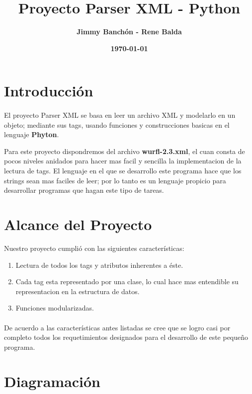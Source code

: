 \documentclass[11pt]{article}
\title{\textbf{Proyecto Parser XML - Python}}
\author{\textbf{Jimmy Banchón - Rene Balda}}
\date{\textbf{\today}}
\begin{document}


\maketitle
\section{\textbf{Introducción}} 
\paragraph{} \noindent
El proyecto Parser XML se basa en leer un archivo XML y modelarlo en un objeto; mediante sus tags, usando funciones y construcciones basicas en el lenguaje {\textbf{Phyton}}.

Para este proyecto dispondremos del archivo {\textbf{wurfl-2.3.xml}}, el cuan consta de pocos niveles anidados para hacer mas facil y sencilla la implementacion de la lectura de tags. El lenguaje en el que se desarrollo este programa hace que los strings sean mas faciles de leer; por lo tanto es un lenguaje propicio para desarrollar programas que hagan este tipo de tareas.
\section{\textbf{Alcance del Proyecto}}

Nuestro proyecto cumplió con las siguientes características:
\begin{enumerate}
\item 
Lectura de todos los tags y atributos inherentes a éste.

\item
Cada tag esta representado por una clase, lo cual hace mas entendible su representacion en la estructura de datos.

\item
Funciones modularizadas.

\end{enumerate}
\paragraph{} \noindent De acuerdo a las características antes listadas se cree que se logro casi por completo todos los requetimientos designados para el desarrollo de este pequeño programa.

\section{Diagramación}
\end{document}
